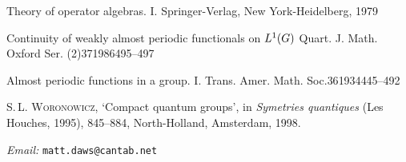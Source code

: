 \documentclass[twoside,a4paper]{article}
\theoremstyle{definition}
\theoremstyle{remark}
\begin{document}
\begin{thebibliography}{99}
 
   {Theory of operator algebras. I.}
   {Springer-Verlag, New York-Heidelberg, 1979}

 
   {Continuity of weakly almost periodic functionals on $L\sp 1(G)$}
   {Quart. J. Math. Oxford Ser. (2)}{37}{1986}{495--497}

 
   {Almost periodic functions in a group. I.}
   {Trans. Amer. Math. Soc.}{36}{1934}{445--492}

 \textsc{S.\,L. Woronowicz},
   `Compact quantum groups', in \emph{Symetries quantiques} (Les Houches, 1995),
   845--884, North-Holland, Amsterdam, 1998. 

\end{thebibliography}

\bigskip\noindent\emph{Email:} \texttt{matt.daws@cantab.net}
\end{document}
